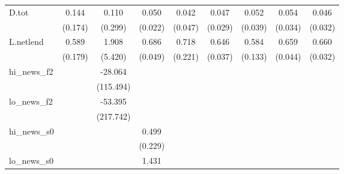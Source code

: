 {\begin{tabular}{l*{8}{c}}
\addlinespace
D.tot       &       0.144         &       0.110         &       0.050\sym{**} &       0.042         &       0.047         &       0.052         &       0.054         &       0.046         \\
            &     (0.174)         &     (0.299)         &     (0.022)         &     (0.047)         &     (0.029)         &     (0.039)         &     (0.034)         &     (0.032)         \\
\addlinespace
L.netlend   &       0.589\sym{***}&       1.908         &       0.686\sym{***}&       0.718\sym{***}&       0.646\sym{***}&       0.584\sym{***}&       0.659\sym{***}&       0.660\sym{***}\\
            &     (0.179)         &     (5.420)         &     (0.049)         &     (0.221)         &     (0.037)         &     (0.133)         &     (0.044)         &     (0.032)         \\
\addlinespace
hi\_news\_f2  &                     &     -28.064         &                     &                     &                     &                     &                     &                     \\
            &                     &   (115.494)         &                     &                     &                     &                     &                     &                     \\
\addlinespace
lo\_news\_f2  &                     &     -53.395         &                     &                     &                     &                     &                     &                     \\
            &                     &   (217.742)         &                     &                     &                     &                     &                     &                     \\
\addlinespace
hi\_news\_s0  &                     &                     &       0.499\sym{**} &                     &                     &                     &                     &                     \\
            &                     &                     &     (0.229)         &                     &                     &                     &                     &                     \\
\addlinespace
lo\_news\_s0  &                     &                     &       1.431\sym{*}  &                     &                     &                     &                     &                     \\

\end{tabular}}
